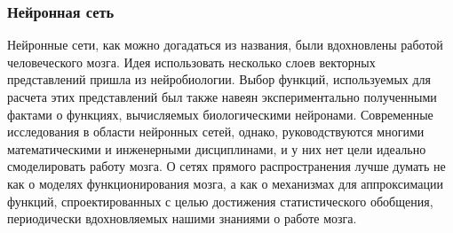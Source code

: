 

\subsubsection{Нейронная сеть}

Нейронные сети, как можно догадаться из названия, были вдохновлены работой человеческого 
мозга. Идея использовать несколько слоев векторных представлений пришла из нейробиологии. 
Выбор функций, используемых для расчета этих представлений был также навеян 
экспериментально полученными фактами о функциях, вычисляемых биологическими нейронами. 
Современные исследования в области нейронных сетей, однако, руководствуются 
многими математическими и инженерными дисциплинами, и у них нет цели идеально 
смоделировать работу мозга. О сетях прямого распространения лучше думать 
не как о моделях функционирования мозга, а как о 
механизмах для аппроксимации функций, спроектированных с целью достижения 
статистического обобщения, периодически вдохновляемых нашими знаниями о работе 
мозга.



